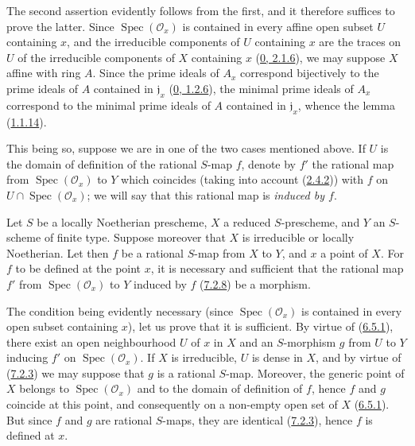 The second assertion evidently follows from the first, and it therefore
suffices to prove the latter. Since $\operatorname{Spec}(\mathscr{O}_x)$ is
contained in every affine open subset $U$ containing $x$, and the irreducible
components of $U$ containing $x$ are the traces on $U$ of the irreducible
components of $X$ containing $x$
(\hyperref[0.2.1.6]{0, 2.1.6}), we may suppose $X$ affine with ring $A$.
Since the prime ideals of $A_x$ correspond bijectively to the prime ideals
of $A$ contained in $\mathfrak{j}_x$
(\hyperref[0.1.2.6]{0, 1.2.6}), the minimal prime ideals of $A_x$
correspond to the minimal prime ideals of $A$ contained in
$\mathfrak{j}_x$, whence the lemma (\hyperref[I.1.1.14]{1.1.14}).

This being so, suppose we are in one of the two cases mentioned above. If $U$
is the domain of definition of the rational $S$-map $f$, denote by $f'$ the
rational map from $\operatorname{Spec}(\mathscr{O}_x)$ to $Y$ which coincides
(taking into account (\hyperref[I.2.4.2]{2.4.2})) with $f$ on
$U\cap\operatorname{Spec}(\mathscr{O}_x)$; we will say that this rational map
is \emph{induced by $f$}.

\begin{proposition}[7.2.9]
\label{I.7.2.9}
Let $S$ be a locally Noetherian prescheme, $X$ a reduced $S$-prescheme, and
$Y$ an $S$-scheme of finite type. Suppose moreover that $X$ is irreducible or
locally Noetherian. Let then $f$ be a rational $S$-map from $X$ to $Y$, and
$x$ a point of $X$. For $f$ to be defined at the point $x$, it is necessary
and sufficient that the rational map $f'$ from
$\operatorname{Spec}(\mathscr{O}_x)$ to $Y$ induced by $f$
(\hyperref[I.7.2.8]{7.2.8}) be a morphism.
\end{proposition}

The condition being evidently necessary (since
$\operatorname{Spec}(\mathscr{O}_x)$ is contained in every open subset containing
$x$), let us prove that it is sufficient. By virtue of
(\hyperref[I.6.5.1]{6.5.1}), there exist an open neighbourhood $U$ of $x$
in $X$ and an $S$-morphism $g$ from $U$ to $Y$ inducing $f'$ on
$\operatorname{Spec}(\mathscr{O}_x)$. If $X$ is irreducible, $U$ is dense in
$X$, and by virtue of (\hyperref[I.7.2.3]{7.2.3}) we may suppose that $g$
is a rational $S$-map. Moreover, the generic point of $X$ belongs to
$\operatorname{Spec}(\mathscr{O}_x)$ and to the domain of definition of $f$,
hence $f$ and $g$ coincide at this point, and consequently on a non-empty open
set of $X$ (\hyperref[I.6.5.1]{6.5.1}). But since $f$ and $g$ are rational
$S$-maps, they are identical (\hyperref[I.7.2.3]{7.2.3}), hence $f$ is
defined at $x$.

